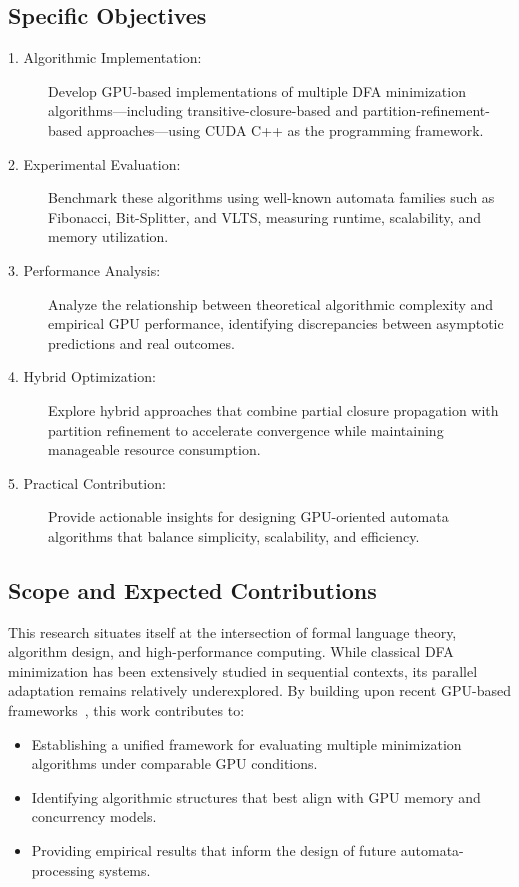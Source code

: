 \subsection{Specific Objectives}
\begin{description}
    \item[1. Algorithmic Implementation:] Develop GPU-based implementations of multiple DFA minimization algorithms—including transitive-closure-based and partition-refinement-based approaches—using CUDA C++ as the programming framework.
    \item[2. Experimental Evaluation:] Benchmark these algorithms using well-known automata families such as Fibonacci, Bit-Splitter, and VLTS, measuring runtime, scalability, and memory utilization.
    \item[3. Performance Analysis:] Analyze the relationship between theoretical algorithmic complexity and empirical GPU performance, identifying discrepancies between asymptotic predictions and real outcomes.
    \item[4. Hybrid Optimization:] Explore hybrid approaches that combine partial closure propagation with partition refinement to accelerate convergence while maintaining manageable resource consumption.
    \item[5. Practical Contribution:] Provide actionable insights for designing GPU-oriented automata algorithms that balance simplicity, scalability, and efficiency.
\end{description}

\subsection{Scope and Expected Contributions}

This research situates itself at the intersection of formal language theory, algorithm design, and high-performance computing. While classical DFA minimization has been extensively studied in sequential contexts, its parallel adaptation remains relatively underexplored. By building upon recent GPU-based frameworks~\cite{wijs2015,martenswijs2024}, this work contributes to:
\begin{itemize}
    \item Establishing a unified framework for evaluating multiple minimization algorithms under comparable GPU conditions.
    \item Identifying algorithmic structures that best align with GPU memory and concurrency models.
    \item Providing empirical results that inform the design of future automata-processing systems.
\end{itemize}

